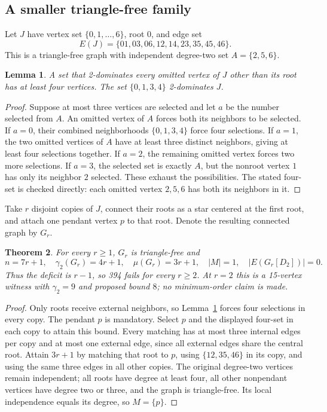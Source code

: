 \documentclass[11pt,a4paper]{article}
\newtheorem{theorem}{Theorem}[section]
\newtheorem{lemma}[theorem]{Lemma}
\theoremstyle{definition}\newtheorem{definition}[theorem]{Definition}
\theoremstyle{remark}\newtheorem{remark}[theorem]{Remark}
\begin{document}
\subsection{A smaller triangle-free family}
Let $J$ have vertex set $\{0,1,\ldots,6\}$, root $0$, and edge set
\[
 E(J)=\{01,03,06,12,14,23,35,45,46\}.
\]
This is a triangle-free graph with independent degree-two set
$A=\{2,5,6\}$.

\begin{lemma}\label{r11td:rigid}
A set that 2-dominates every omitted vertex of $J$ other than its root
has at least four vertices. The set $\{0,1,3,4\}$ 2-dominates $J$.
\end{lemma}
\begin{proof}
Suppose at most three vertices are selected and let $a$ be the number
selected from $A$. An omitted vertex of $A$ forces both its neighbors
to be selected. If $a=0$, their combined neighborhoods
$\{0,1,3,4\}$ force four selections. If $a=1$, the two omitted
vertices of $A$ have at least three distinct neighbors, giving at least
four selections together. If $a=2$, the remaining omitted vertex
forces two more selections. If $a=3$, the selected set is exactly
$A$, but the nonroot vertex $1$ has only its neighbor $2$ selected.
These exhaust the possibilities. The stated four-set is checked
directly: each omitted vertex $2,5,6$ has both its neighbors in it.
\end{proof}

Take $r$ disjoint copies of $J$, connect their roots as a star centered
at the first root, and attach one pendant vertex $p$ to that root.
Denote the resulting connected graph by $G_r$.

\begin{theorem}\label{r11td:small}
For every $r\ge1$, $G_r$ is triangle-free and
\[
 n=7r+1,\quad \gamma_2(G_r)=4r+1,\quad
 \mu(G_r)=3r+1,\quad |M|=1,\quad |E(G_r[D_2])|=0.
\]
Thus the deficit is $r-1$, so 394 fails for every $r\ge2$. At $r=2$ this is a 15-vertex witness with
$\gamma_2=9$ and proposed bound $8$; no minimum-order claim is made.
\end{theorem}
\begin{proof}
Only roots receive external neighbors, so Lemma~\ref{r11td:rigid}
forces four selections in every copy. The pendant $p$ is mandatory.
Select $p$ and the displayed four-set in each copy to attain this
bound. Every matching has at most three internal edges per copy and
at most one external edge, since all external edges share the central
root. Attain $3r+1$ by matching that root to $p$, using
$\{12,35,46\}$ in its copy, and using the same three edges in all
other copies. The original degree-two vertices remain independent;
all roots have degree at least four, all other nonpendant vertices
have degree two or three, and the graph is triangle-free. Its local
independence equals its degree, so $M=\{p\}$.
\end{proof}
\end{document}
